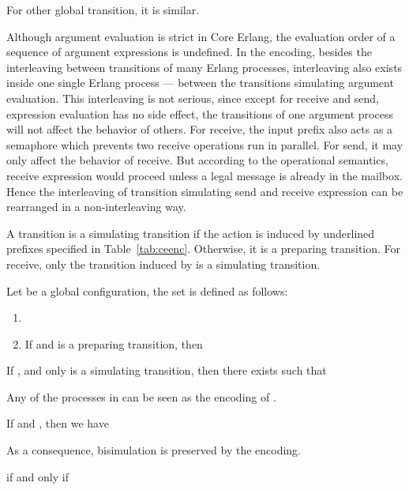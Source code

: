 \documentclass[runningheads, envcountsame, a4paper]{llncs}
\begin{document}
For other global transition, it is similar.

Although argument evaluation is strict in Core Erlang, the evaluation order of a sequence of argument expressions is undefined.
In the encoding, besides the interleaving between transitions of many Erlang processes, interleaving also exists
inside one single Erlang process --- between the transitions simulating argument evaluation.
This interleaving is not serious, since except for receive and send, expression evaluation has no side effect,
the transitions of one argument process will not affect the behavior of others.
For receive, the input prefix  also acts as a semaphore which prevents two receive operations run in parallel.
For send, it may only affect the behavior of receive. But according to the operational semantics,
receive expression would proceed unless a legal message is already in the mailbox.
Hence the interleaving of transition simulating send and receive expression can be rearranged in a non-interleaving way.


\begin{definition}
  A transition  is a simulating transition if the action 
  is induced by underlined prefixes specified in Table~\ref{tab:ceenc}.
  Otherwise, it is a preparing transition.
  For receive, only the transition  induced by  is a simulating transition.
  \label{def:cekey}
\end{definition}

\begin{definition}
  Let  be a global configuration, the set  is defined as follows:
  \begin{enumerate}
    \item 
    \item If  and  is a preparing transition, then 
  \end{enumerate}
  \label{def:cetsset}
\end{definition}

\begin{lemma}
  If , and only  is a simulating transition,
  then there exists  such that
  
  \label{lem:ceexist}
\end{lemma}

Any of the processes in  can be seen as the encoding of .
\begin{lemma}
  If  and , then we have 
\end{lemma}

As a consequence, bisimulation is preserved by the encoding.
\begin{theorem}
   if and only if 
\end{theorem}
\end{document}
